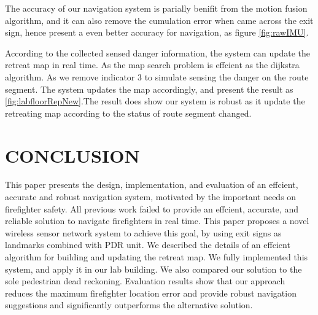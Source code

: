 \documentclass[conference]{IEEEtran}
\begin{document}
  The accuracy of our navigation system is parially benifit from the motion fusion algorithm, and it can also remove the cumulation error when came across the exit sign, hence present a even better accuracy for navigation, as figure \ref{fig:rawIMU}. 

  According to the collected sensed danger information, the system can update the retreat map in real time. As the map search problem is effcient as the dijkstra algorithm. As we remove indicator 3 to simulate sensing the danger on the route segment. The system updates the map accordingly, and present the result as \ref{fig:labfloorRepNew}.The result does show our system is robust as it update the retreating map according to the status of route segment changed.




  \section{CONCLUSION}
  This paper presents the design, implementation, and evaluation of an effcient, accurate and robust navigation system, motivated by the important needs on ﬁreﬁghter safety. All previous work failed to provide an effcient, accurate, and reliable solution to navigate ﬁreﬁghters in real time. This paper proposes a novel wireless sensor network system to achieve this goal, by using exit signs as landmarks combined with PDR unit. We described the details of an effcient algorithm for building and updating the retreat map. We fully implemented this system, and apply it in our lab building. We also compared our solution to the sole pedestrian dead reckoning. Evaluation results show that our approach reduces the maximum ﬁreﬁghter location error and provide robust navigation suggestions and signiﬁcantly outperforms the alternative solution.





%
%
%
\end{document}
